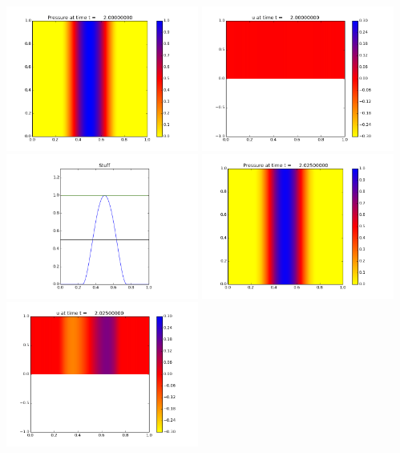 \documentclass[11pt]{article}
\begin{document}
\vskip 10pt 
\includegraphics[width=0.475\textwidth]{frame0080fig0.png}
\includegraphics[width=0.475\textwidth]{frame0080fig1.png}
\vskip 10pt 
\includegraphics[width=0.475\textwidth]{frame0080fig3.png}
\vskip 10pt 
\includegraphics[width=0.475\textwidth]{frame0081fig0.png}
\includegraphics[width=0.475\textwidth]{frame0081fig1.png}
\end{document}
